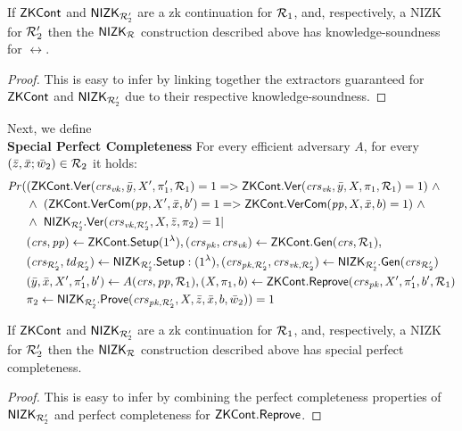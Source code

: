\begin{lemma} 
\label{le:KS_for_nizkR}
If ${\mathsf{ZKCont}}$ and ${\mathsf{NIZK_{\mathcal{R}'_2}}}$ are a zk continuation for $\mathcal{R}_1$, and, respectively, a NIZK 
for $\mathcal{R}_2'$ then the ${\mathsf{NIZK_{\mathcal{R}}}}$ construction described above has knowledge-soundness for $\rel$. 
\end{lemma} 
\begin{proof}This is easy to infer by linking together the extractors guaranteed for ${\mathsf{ZKCont}}$ and ${\mathsf{NIZK_{\mathcal{R}'_2}}}$ due to their respective 
knowledge-soundness.
\end{proof}
 
\noindent Next, we define \\ 
\noindent \textbf{Special Perfect Completeness} For every efficient adversary $A$, for every 
 $(\bar{z}, \bar{x}; \bar{w}_2) \in \mathcal{R}_2$ it holds: 
\begin{align*}
\mathit{Pr} (& ({\mathsf{ZKCont}}.{\mathsf{Ver}}(\mathit{crs}_{\mathit{vk}}, \bar{y}, X', \pi'_1, \mathcal{R}_1) = 1  = >  {\mathsf{ZKCont}}.{\mathsf{Ver}}(\mathit{crs}_{\mathit{vk}}, \bar{y}, X, \pi_1, \mathcal{R}_1) = 1)  \ \wedge \  \\
                   & \wedge \ ({\mathsf{ZKCont}}.{\mathsf{VerCom}} (\mathit{pp}, X', \bar{x}, b') = 1 => {\mathsf{ZKCont}}.{\mathsf{VerCom}} (\mathit{pp}, X, \bar{x}, b) = 1) \ \wedge \\
                   & \wedge \ {\mathsf{NIZK_{\mathcal{R}'_2}}}.{\mathsf{Ver}}(\mathit{crs}_{\mathit{vk},{\mathcal{R}'_2}}, X, \bar{z}, \pi_2) =1 | \\
                   & (\mathit{crs}, \mathit{pp}) \leftarrow {\ensuremath{\mathsf{ZKCont}}}.{\mathsf{Setup}} (1^{\lambda}), (\mathit{crs}_{\mathit{pk}}, \mathit{crs}_{\mathit{vk}}) \leftarrow {\ensuremath{\mathsf{ZKCont}}}.\mathsf{Gen}(\mathit{crs}, \mathcal{R}_1), \\ 
                   & (\mathit{crs}_{\mathcal{R}'_2}, \mathit{td}_{\mathcal{R}'_2}) \leftarrow {\ensuremath{\mathsf{NIZK_{\mathcal{R}'_2}}}}.{\mathsf{Setup}}: (1^{\lambda}), (\mathit{crs}_{\mathit{pk},{\mathcal{R}'_2}}, \mathit{crs}_{\mathit{vk},{\mathcal{R}'_2}}) \leftarrow {\ensuremath{\mathsf{NIZK_{\mathcal{R}'_2}}}}.\mathsf{Gen}(\mathit{crs}_{\mathcal{R}'_2}) \\
                   & (\bar{y}, \bar{x}, X', \pi'_1, b') \leftarrow A(\mathit{crs},\mathit{pp}, \mathcal{R}_1), (X, \pi_1, b) \leftarrow {\ensuremath{\mathsf{ZKCont}}}.{\mathsf{Reprove}}(\mathit{crs}_{\mathit{pk}}, X', \pi'_1, b', \mathcal{R}_1) \\
                   &\pi_2 \leftarrow {\ensuremath{\mathsf{NIZK_{\mathcal{R}'_2}}}}.{\mathsf{Prove}}(\mathit{crs}_{\mathit{pk},{\mathcal{R}'_2}}, X, \bar{z}, \bar{x}, b, \bar{w}_2)) = 1
\end{align*}

\begin{lemma} 
\label{le:specialCompl_for_nizkR}
If ${\mathsf{ZKCont}}$ and ${\mathsf{NIZK_{\mathcal{R}'_2}}}$ are a zk continuation for $\mathcal{R}_1$, and, respectively, a NIZK 
for $\mathcal{R}_2'$ then the ${\mathsf{NIZK_{\mathcal{R}}}}$ construction described above has special perfect completeness.
\end{lemma} 
\begin{proof} This is easy to infer by combining the perfect completeness properties of ${\mathsf{NIZK_{\mathcal{R}'_2}}}$ and perfect completeness 
for ${\mathsf{ZKCont}}.{\mathsf{Reprove}}$.
\end{proof}

